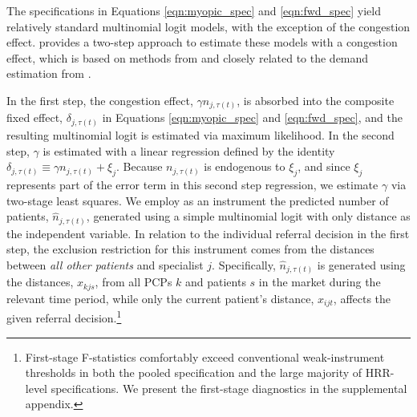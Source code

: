 \documentclass[12pt]{article}
\begin{document}
The specifications in Equations \eqref{eqn:myopic_spec} and \eqref{eqn:fwd_spec} yield relatively standard multinomial logit models, with the exception of the congestion effect. \cite{richards-shubik2021} provides a two-step approach to estimate these models with a congestion effect, which is based on methods from \cite{bayer2007} and closely related to the demand estimation from \cite*{berry1995}. 

In the first step, the congestion effect, $\gamma n_{j, \tau(t)}$, is absorbed into the composite fixed effect, $\delta_{j, \tau(t)}$ in Equations \eqref{eqn:myopic_spec} and \eqref{eqn:fwd_spec}, and the resulting multinomial logit is estimated via maximum likelihood. In the second step, $\gamma$ is estimated with a linear regression defined by the identity $\delta_{j, \tau(t)} \equiv \gamma n_{j, \tau(t)} + \xi_{j}$. Because $n_{j, \tau(t)}$ is endogenous to $\xi_j$, and since $\xi_{j}$ represents part of the error term in this second step regression, we estimate $\gamma$ via two-stage least squares. We employ as an instrument the predicted number of patients, $\hat n_{j, \tau(t)}$, generated using a simple multinomial logit with only distance as the independent variable. In relation to the individual referral decision in the first step, the exclusion restriction for this instrument comes from the distances between \emph{all other patients} and specialist $j$. Specifically, $\hat n_{j, \tau(t)}$ is generated using the distances, $x_{kjs}$, from all PCPs $k$ and patients $s$ in the market during the relevant time period, while only the current patient's distance, $x_{ijt}$, affects the given referral decision.\footnote{First-stage F-statistics comfortably exceed conventional weak-instrument thresholds in both the pooled specification and the large majority of HRR-level specifications. We present the first-stage diagnostics in the supplemental appendix.}
\end{document}
